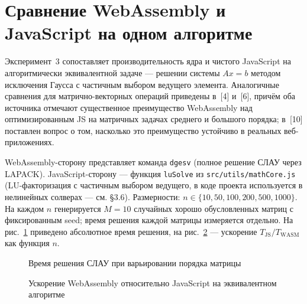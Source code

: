 \documentclass[12pt, oneside]{book}
\begin{document}
\section{Сравнение WebAssembly и JavaScript на одном алгоритме}
\label{sec:exp_wasmjs}

    \quad Эксперимент~3 сопоставляет производительность ядра и чистого JavaScript на алгоритмически эквивалентной задаче --- решении системы $Ax = b$ методом исключения Гаусса с частичным выбором ведущего элемента. Аналогичные сравнения для матрично-векторных операций приведены в~[4] и~[6], причём оба источника отмечают существенное преимущество WebAssembly над оптимизированным JS на матричных задачах среднего и большого порядка; в~[10] поставлен вопрос о том, насколько это преимущество устойчиво в реальных веб-приложениях.

    \quad WebAssembly-сторону представляет команда \texttt{dgesv} (полное решение СЛАУ через LAPACK). JavaScript-сторону --- функция \texttt{luSolve} из \texttt{src/utils/mathCore.js} (LU-факторизация с частичным выбором ведущего, в коде проекта используется в нелинейных солверах --- см. §3.6). Размерности: $n \in \{10, 50, 100, 200, 500, 1000\}$. На каждом $n$ генерируется $M = 10$ случайных хорошо обусловленных матриц с фиксированным seed; время решения каждой матрицы измеряется отдельно. На рис.~\ref{fig:exp_wasmjs_abs} приведено абсолютное время решения, на рис.~\ref{fig:exp_wasmjs_speedup} --- ускорение $T_\text{JS} / T_\text{WASM}$ как функция $n$.

\begin{figure}[htbp]
\centering
{}
\caption{Время решения СЛАУ при варьировании порядка матрицы}
\label{fig:exp_wasmjs_abs}
\end{figure}

\begin{figure}[htbp]
\centering
{}
\caption{Ускорение WebAssembly относительно JavaScript на эквивалентном алгоритме}
\label{fig:exp_wasmjs_speedup}
\end{figure}
\end{document}
